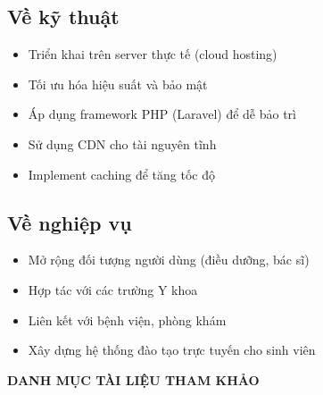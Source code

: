\documentclass[a4paper,12pt]{report}
\begin{document}
\subsection{Về kỹ thuật}
\begin{itemize}
    \item Triển khai trên server thực tế (cloud hosting)
    \item Tối ưu hóa hiệu suất và bảo mật
    \item Áp dụng framework PHP (Laravel) để dễ bảo trì
    \item Sử dụng CDN cho tài nguyên tĩnh
    \item Implement caching để tăng tốc độ
\end{itemize}

\subsection{Về nghiệp vụ}
\begin{itemize}
    \item Mở rộng đối tượng người dùng (điều dưỡng, bác sĩ)
    \item Hợp tác với các trường Y khoa
    \item Liên kết với bệnh viện, phòng khám
    \item Xây dựng hệ thống đào tạo trực tuyến cho sinh viên
\end{itemize}

\newpage
{}
\begin{center}
\textbf{\Large DANH MỤC TÀI LIỆU THAM KHẢO}
\end{center}
\vspace{1cm}
\end{document}
